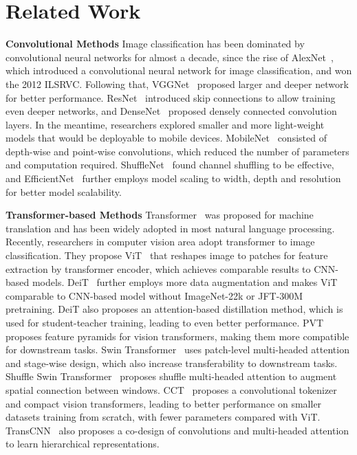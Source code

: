 \documentclass[final]{cvpr}
\begin{document}
\section{Related Work}
\noindent \textbf{Convolutional Methods} Image classification has been dominated by convolutional neural networks for almost a decade, since the rise of AlexNet~\cite{krizhevsky2012imagenet}, which introduced a convolutional neural network for image classification, and won the 2012 ILSRVC. Following that, VGGNet~\cite{simonyan2014very} proposed larger and deeper network for better performance. ResNet~\cite{he2016deep} introduced skip connections to allow training even deeper networks, and DenseNet~\cite{huang2017densely} proposed densely connected convolution layers. In the meantime, researchers explored smaller and more light-weight models that would be deployable to mobile devices. MobileNet~\cite{howard2017mobilenets,sandler2018mobilenetv2} consisted of depth-wise and point-wise convolutions, which reduced the number of parameters and computation required. ShuffleNet~\cite{ma2018shufflenet} found channel shuffling to be effective, and EfficientNet~\cite{tan2019efficientnet} further employs model scaling to width, depth and resolution for better model scalability. 

\noindent \textbf{Transformer-based Methods} Transformer~\cite{vaswani2017attention} was proposed for machine translation and has been widely adopted in most natural language processing. Recently, researchers in computer vision area adopt transformer to image classification. They propose ViT~\cite{dosovitskiy2020image} that reshapes image to patches for feature extraction by transformer encoder, which achieves comparable results to CNN-based models. DeiT~\cite{touvron2021training} further employs more data augmentation and makes ViT comparable to CNN-based model without ImageNet-22k or JFT-300M pretraining. DeiT also proposes an attention-based distillation method, which is used for student-teacher training, leading to even better performance. PVT~\cite{wang2021pyramid} proposes  feature pyramids for vision transformers, making them more compatible for downstream tasks. Swin Transformer~\cite{liu2021swin} uses patch-level multi-headed attention and stage-wise design, which also increase transferability to downstream tasks. Shuffle Swin Transformer~\cite{huang2021shuffle} proposes shuffle multi-headed attention to augment spatial connection between windows. CCT~\cite{hassani2021escaping} proposes a convolutional tokenizer and compact vision transformers, leading to better performance on smaller datasets training from scratch, with fewer parameters compared with ViT. TransCNN~\cite{liu2021transformer} also proposes a co-design of convolutions and multi-headed attention to learn hierarchical representations. 
\end{document}
